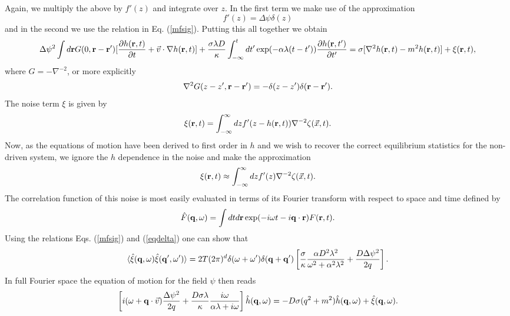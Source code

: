 Again, we multiply the above by $f'(z)$ and integrate over $z$. In the first term we make use of the approximation
\begin{equation}
f'(z)=\Delta\psi \delta(z)\label{eqdelta}
\end{equation}
and in the second we use the relation in Eq. (\ref{mfsig}). Putting this all together we obtain
\begin{equation}
\Delta\psi^2 \int d{\bf r} G(0,{\bf r}-{\bf r}') [\frac{\partial h({\bf r},t)}{\partial t} +\vec{v}\cdot\nabla h({\bf r},t)] +\frac{\sigma\lambda D}{\kappa}\int_{-\infty}^t dt'
\exp(-\alpha\lambda(t-t'))\frac{\partial h({\bf r},t')}{\partial t'}
= \sigma[\nabla^2 h({\bf r},t)-m^2 h({\bf r},t)] + \xi({\bf r},t),\label{em}
\end{equation}
where $G= -\nabla^{-2}$, or more explicitly
\begin{equation}
\nabla^2 G(z-z',{\bf r}-{\bf r}') = -\delta(z-z') \delta({\bf r}-{\bf r'}).
\end{equation}
The noise term $\xi$ is given by
\begin{equation}
\xi({\bf r},t) = \int_{-\infty}^{\infty} dz f'(z-h({\bf r},t)) \nabla^{-2} \zeta(\vec{x},t).
\end{equation}
Now, as the equations of motion have been derived to first order in $h$ and we wish to recover the correct equilibrium statistics for the non-driven system, we ignore the $h$ dependence in the noise and make the approximation
\begin{equation}
\xi({\bf r},t) \approx \int_{-\infty}^{\infty} dz f'(z) \nabla^{-2} \zeta(\vec{x},t).
\end{equation}
The correlation function of this noise is most easily evaluated in terms of its Fourier transform with respect to  space and time  defined by
\begin{equation}
\hat F({\bf q},\omega)=\int dt d{\bf r}\exp(-i\omega t -i{\bf q}\cdot{\bf r}) F({\bf r},t).
\end{equation}
Using the relations Eqs. (\ref{mfsig}) and (\ref{eqdelta}) one  can show that
\begin{equation}
\langle \hat \xi({\bf q},\omega)\hat \xi({\bf q}',\omega')\rangle 
=2T(2\pi)^d \delta(\omega +\omega') \delta({\bf q}+{\bf q}') \left[
\frac{\sigma}{\kappa}\frac{\alpha D^2\lambda^2}{\omega^2 +\alpha^2\lambda^2} + \frac{D\Delta\psi^2}{2q}\right].
\end{equation}
In full Fourier space the equation of motion for the field $\psi$ then reads
\begin{equation}
\left[i(\omega+{\bf q}\cdot\vec{v})\frac{\Delta\psi^2}{2q} + \frac{D\sigma\lambda}{\kappa} \frac{i\omega}{\alpha\lambda+i\omega}\right] \hat h({\bf q},\omega)= -D\sigma(q^2+m^2)\hat h({\bf q},\omega)+ \hat\xi({\bf q},\omega).\label{dyn}
\end{equation}

